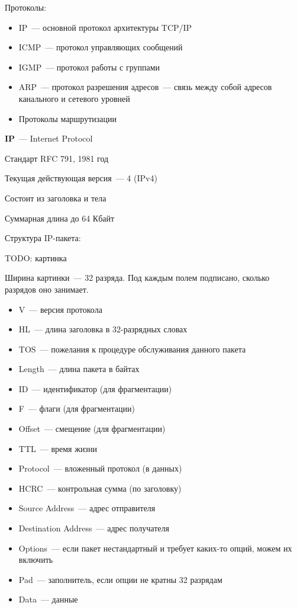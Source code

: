 
Протоколы:
\begin{itemize}
    \item IP~--- основной протокол архитектуры TCP/IP
    \item ICMP~--- протокол управляющих сообщений
    \item IGMP~--- протокол работы с группами
    \item ARP~--- протокол разрешения адресов~--- связь между собой адресов канального и сетевого уровней
    \item Протоколы маршрутизации
\end{itemize}


{\bf IP}~--- Internet Protocol

Стандарт RFC 791, 1981 год

Текущая действующая версия~--- 4 (IPv4)

Состоит из заголовка и тела

Суммарная длина до 64 Кбайт

Структура IP-пакета:

TODO: картинка

Ширина картинки~--- 32 разряда. Под каждым полем подписано, сколько разрядов оно занимает.

\begin{itemize}
    \item V~--- версия протокола
    \item HL~--- длина заголовка в 32-разрядных словах
    \item TOS~--- пожелания к процедуре обслуживания данного пакета
    \item Length~--- длина пакета в байтах
    \item ID~--- идентификатор (для фрагментации)
    \item F~--- флаги (для фрагментации)
    \item Offset~--- смещение (для фрагментации)
    \item TTL~--- время жизни
    \item Protocol~--- вложенный протокол (в данных)
    \item HCRC~--- контрольная сумма (по заголовку)
    \item Source Address~--- адрес отправителя
    \item Destination Address~--- адрес получателя
    \item Options~--- если пакет нестандартный и требует каких-то опций, можем их включить
    \item Pad~--- заполнитель, если опции не кратны 32 разрядам
    \item Data~--- данные
\end{itemize}

